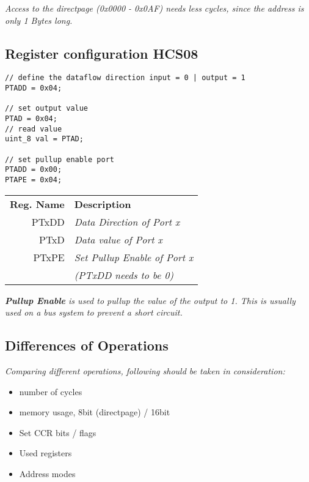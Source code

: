 \textit{
    Access to the directpage (0x0000 - 0x0AF) needs less cycles,
    since the address is only 1 Bytes long.
}

\subsection{Register configuration HCS08}

\begin{lstlisting}
// define the dataflow direction input = 0 | output = 1
PTADD = 0x04;

// set output value
PTAD = 0x04;
// read value
uint_8 val = PTAD;

// set pullup enable port
PTADD = 0x00;
PTAPE = 0x04;
\end{lstlisting}

\begin{tabular}{rl}
    \textbf{Reg. Name} & \textbf{Description} \\
    PTxDD & \textit{Data Direction of Port x} \\
    PTxD  & \textit{Data value of Port x} \\
    PTxPE & \textit{Set Pullup Enable of Port x} \\
          & \textit{(PTxDD needs to be 0)} \\
\end{tabular}

\textit{
    \textbf{Pullup Enable} is used to pullup the value
    of the output to 1. This is usually used on a bus system
    to prevent a short circuit.
}

\subsection{Differences of Operations}

\textit{
    Comparing different operations, following should be taken
    in consideration:
}

\begin{itemize}
    \item{number of cycles}
    \item{memory usage, 8bit (directpage) / 16bit}
    \item{Set CCR bits / flags}
    \item{Used registers}
    \item{Address modes}
\end{itemize}
